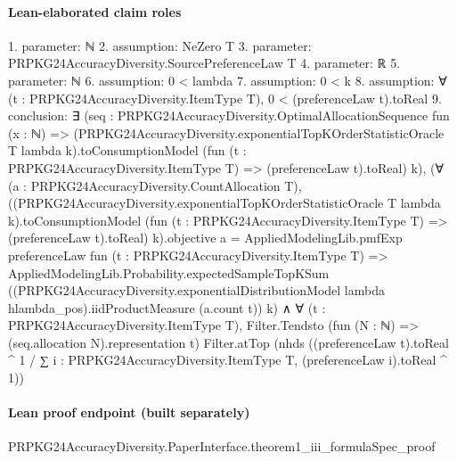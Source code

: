 \documentclass[10pt]{article}
\begin{document}
\paragraph{Lean-elaborated claim roles}\begin{ReviewVerbatim}
1. parameter: ℕ
2. assumption: NeZero T
3. parameter: PRPKG24AccuracyDiversity.SourcePreferenceLaw T
4. parameter: ℝ
5. parameter: ℕ
6. assumption: 0 < lambda
7. assumption: 0 < k
8. assumption: ∀ (t : PRPKG24AccuracyDiversity.ItemType T), 0 < (preferenceLaw t).toReal
9. conclusion: ∃ (seq :
  PRPKG24AccuracyDiversity.OptimalAllocationSequence fun (x : ℕ) =>
    (PRPKG24AccuracyDiversity.exponentialTopKOrderStatisticOracle T lambda k).toConsumptionModel
      (fun (t : PRPKG24AccuracyDiversity.ItemType T) => (preferenceLaw t).toReal) k),
  (∀ (a : PRPKG24AccuracyDiversity.CountAllocation T),
      ((PRPKG24AccuracyDiversity.exponentialTopKOrderStatisticOracle T lambda k).toConsumptionModel
              (fun (t : PRPKG24AccuracyDiversity.ItemType T) => (preferenceLaw t).toReal) k).objective
          a =
        AppliedModelingLib.pmfExp preferenceLaw fun (t : PRPKG24AccuracyDiversity.ItemType T) =>
          AppliedModelingLib.Probability.expectedSampleTopKSum
            ((PRPKG24AccuracyDiversity.exponentialDistributionModel lambda hlambda_pos).iidProductMeasure (a.count t))
            k) ∧
    ∀ (t : PRPKG24AccuracyDiversity.ItemType T),
      Filter.Tendsto (fun (N : ℕ) => (seq.allocation N).representation t) Filter.atTop
        (nhds ((preferenceLaw t).toReal ^ 1 / ∑ i : PRPKG24AccuracyDiversity.ItemType T, (preferenceLaw i).toReal ^ 1))
\end{ReviewVerbatim}

\paragraph{Lean proof endpoint (built separately)}\begin{ReviewVerbatim}
PRPKG24AccuracyDiversity.PaperInterface.theorem1_iii_formulaSpec_proof
\end{ReviewVerbatim}
\end{document}

